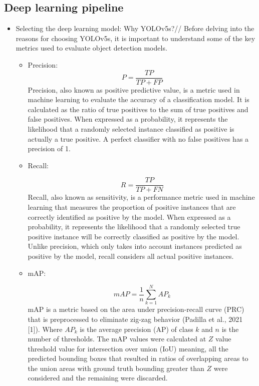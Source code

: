 \subsection{Deep learning pipeline}
\begin{itemize}
\item{Selecting the deep learning model: Why YOLOv5s?}//
Before delving into the reasons for choosing YOLOv5s, it is important to understand some of the key metrics used to evaluate object detection models. 
\begin{itemize}
\item Precision:
\begin{equation}
P = \frac{TP}{TP+FP}
\end{equation}
Precision, also known as positive predictive value, is a metric used in machine learning to evaluate the accuracy of a classification model. It is calculated as the ratio of true positives to the sum of true positives and false positives. When expressed as a probability, it represents the likelihood that a randomly selected instance classified as positive is actually a true positive. A perfect classifier with no false positives has a precision of 1.\cite{KGMM21}

\item Recall:

\begin{equation}
R = \frac{TP}{TP+FN}
\end{equation}
Recall, also known as sensitivity, is a performance metric used in machine learning that measures the proportion of positive instances that are correctly identified as positive by the model. When expressed as a probability, it represents the likelihood that a randomly selected true positive instance will be correctly classified as positive by the model. Unlike precision, which only takes into account instances predicted as positive by the model, recall considers all actual positive instances.\cite{KGMM21}

\item mAP:

\begin{equation}
mAP = \frac{1}{n} \sum_{k=1}^{N} AP_k
\end{equation}
mAP is a metric based on the area under precision-recall curve (PRC) that is preprocessed to eliminate zig-zag behavior (Padilla et al., 2021 [1]). Where $AP_k$ is the average precision (AP) of class $k$ and $n$ is the number of thresholds. The mAP values were calculated at $Z$ value threshold value for intersection over union (IoU) meaning, all the predicted bounding boxes that resulted in ratios of overlapping areas to the union areas with ground truth bounding greater than $Z$ were considered and the remaining were discarded.\cite{MG21}


\end{itemize}
\end{itemize}

